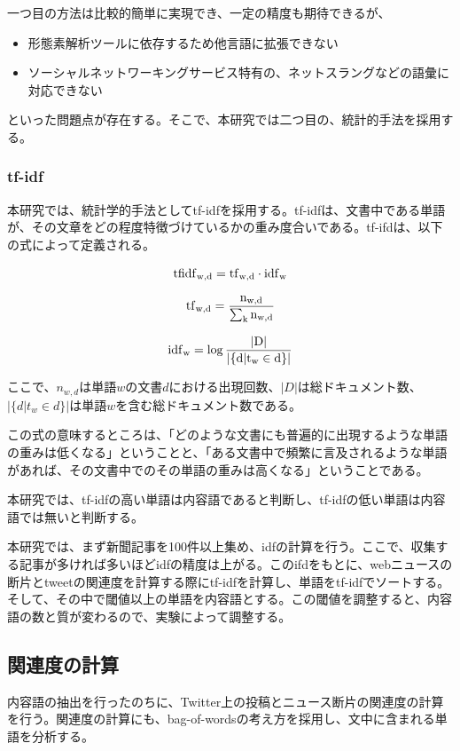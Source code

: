 \documentclass[12pt]{jarticle}
\begin{document}
一つ目の方法は比較的簡単に実現でき、一定の精度も期待できるが、
\begin{itemize}
  \item 形態素解析ツールに依存するため他言語に拡張できない
  \item ソーシャルネットワーキングサービス特有の、ネットスラングなどの語彙に対応できない
\end{itemize}
といった問題点が存在する。そこで、本研究では二つ目の、統計的手法を採用する。

\subsubsection{tf-idf}
本研究では、統計学的手法としてtf-idf\cite{tfidf}を採用する。tf-idfは、文書中である単語が、その文章をどの程度特徴づけているかの重み度合いである。tf-ifdは、以下の式によって定義される。

\begin{equation}
  \rm{tfidf}_{w,d} = \rm{tf}_{w,d} \cdot \rm{idf}_{w}
\end{equation}

\begin{equation}
  \rm{tf}_{w, d} = \frac{n_{w,d}}{\sum_k n_{w,d}}
\end{equation}

\begin{equation}
  \rm{idf}_{w} = \log{\frac{|D|}{|\{d|t_w \in d\}|}}
\end{equation}

ここで、$n_{w,d}$は単語$w$の文書$d$における出現回数、$|D|$は総ドキュメント数、$|\{d|t_w \in d\}|$は単語$w$を含む総ドキュメント数である。

この式の意味するところは、「どのような文書にも普遍的に出現するような単語の重みは低くなる」ということと、「ある文書中で頻繁に言及されるような単語があれば、その文書中でのその単語の重みは高くなる」ということである。

本研究では、tf-idfの高い単語は内容語であると判断し、tf-idfの低い単語は内容語では無いと判断する。

本研究では、まず新聞記事を100件以上集め、idfの計算を行う。ここで、収集する記事が多ければ多いほどidfの精度は上がる。このifdをもとに、webニュースの断片とtweetの関連度を計算する際にtf-idfを計算し、単語をtf-idfでソートする。そして、その中で閾値以上の単語を内容語とする。この閾値を調整すると、内容語の数と質が変わるので、実験によって調整する。

\subsection{関連度の計算}
内容語の抽出を行ったのちに、Twitter上の投稿とニュース断片の関連度の計算を行う。関連度の計算にも、bag-of-wordsの考え方を採用し、文中に含まれる単語を分析する。
\end{document}
